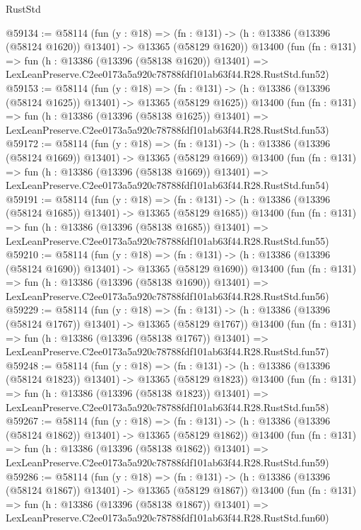 \begin{lexlean}{RustStd}
\begin{coremodule}
@59134 := @58114
    (fun (y : @18) =>
    (fn : @131) -> (h : @13386 (@13396 (@58124 @1620)) @13401) -> @13365 (@58129 @1620))
    @13400
    (fun (fn : @131) =>
    fun (h : @13386 (@13396 (@58138 @1620)) @13401) =>
    LexLeanPreserve.C2ee0173a5a920c78788fdf101ab63f44.R28.RustStd.fun52)
@59153 := @58114
    (fun (y : @18) =>
    (fn : @131) -> (h : @13386 (@13396 (@58124 @1625)) @13401) -> @13365 (@58129 @1625))
    @13400
    (fun (fn : @131) =>
    fun (h : @13386 (@13396 (@58138 @1625)) @13401) =>
    LexLeanPreserve.C2ee0173a5a920c78788fdf101ab63f44.R28.RustStd.fun53)
@59172 := @58114
    (fun (y : @18) =>
    (fn : @131) -> (h : @13386 (@13396 (@58124 @1669)) @13401) -> @13365 (@58129 @1669))
    @13400
    (fun (fn : @131) =>
    fun (h : @13386 (@13396 (@58138 @1669)) @13401) =>
    LexLeanPreserve.C2ee0173a5a920c78788fdf101ab63f44.R28.RustStd.fun54)
@59191 := @58114
    (fun (y : @18) =>
    (fn : @131) -> (h : @13386 (@13396 (@58124 @1685)) @13401) -> @13365 (@58129 @1685))
    @13400
    (fun (fn : @131) =>
    fun (h : @13386 (@13396 (@58138 @1685)) @13401) =>
    LexLeanPreserve.C2ee0173a5a920c78788fdf101ab63f44.R28.RustStd.fun55)
@59210 := @58114
    (fun (y : @18) =>
    (fn : @131) -> (h : @13386 (@13396 (@58124 @1690)) @13401) -> @13365 (@58129 @1690))
    @13400
    (fun (fn : @131) =>
    fun (h : @13386 (@13396 (@58138 @1690)) @13401) =>
    LexLeanPreserve.C2ee0173a5a920c78788fdf101ab63f44.R28.RustStd.fun56)
@59229 := @58114
    (fun (y : @18) =>
    (fn : @131) -> (h : @13386 (@13396 (@58124 @1767)) @13401) -> @13365 (@58129 @1767))
    @13400
    (fun (fn : @131) =>
    fun (h : @13386 (@13396 (@58138 @1767)) @13401) =>
    LexLeanPreserve.C2ee0173a5a920c78788fdf101ab63f44.R28.RustStd.fun57)
@59248 := @58114
    (fun (y : @18) =>
    (fn : @131) -> (h : @13386 (@13396 (@58124 @1823)) @13401) -> @13365 (@58129 @1823))
    @13400
    (fun (fn : @131) =>
    fun (h : @13386 (@13396 (@58138 @1823)) @13401) =>
    LexLeanPreserve.C2ee0173a5a920c78788fdf101ab63f44.R28.RustStd.fun58)
@59267 := @58114
    (fun (y : @18) =>
    (fn : @131) -> (h : @13386 (@13396 (@58124 @1862)) @13401) -> @13365 (@58129 @1862))
    @13400
    (fun (fn : @131) =>
    fun (h : @13386 (@13396 (@58138 @1862)) @13401) =>
    LexLeanPreserve.C2ee0173a5a920c78788fdf101ab63f44.R28.RustStd.fun59)
@59286 := @58114
    (fun (y : @18) =>
    (fn : @131) -> (h : @13386 (@13396 (@58124 @1867)) @13401) -> @13365 (@58129 @1867))
    @13400
    (fun (fn : @131) =>
    fun (h : @13386 (@13396 (@58138 @1867)) @13401) =>
    LexLeanPreserve.C2ee0173a5a920c78788fdf101ab63f44.R28.RustStd.fun60)

\end{coremodule}
\end{lexlean}
